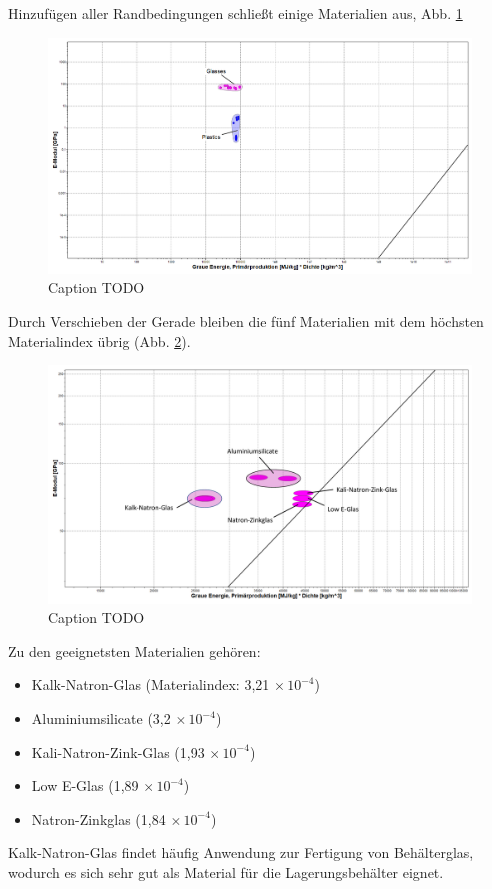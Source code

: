 Hinzufügen aller Randbedingungen schließt einige Materialien aus, Abb. \ref{fig:ces_3_3_2}\\
\begin{figure}[H]
	\centering
	\includegraphics[width=1.0\linewidth]{chapter/Bilder/3_3_2}
	\caption{Caption TODO}
	\label{fig:ces_3_3_2}
\end{figure}
Durch Verschieben der Gerade bleiben die fünf Materialien mit dem höchsten Materialindex übrig (Abb. \ref{fig:ces_3_3_3}).\\
\begin{figure}[H]
	\centering
	\includegraphics[width=1.0\linewidth]{chapter/Bilder/3_3_3}
	\caption{Caption TODO}
	\label{fig:ces_3_3_3}
\end{figure}
Zu den geeignetsten Materialien gehören:
\begin{itemize}
	\item[1)] Kalk-Natron-Glas (Materialindex: 3,21$\,\times10^{-4}$)
	\item[2)] Aluminiumsilicate (3,2$\,\times10^{-4}$) 
	\item[3)] Kali-Natron-Zink-Glas (1,93$\,\times10^{-4}$)
	\item[4)] Low E-Glas (1,89$\,\times10^{-4}$)
	\item[5)] Natron-Zinkglas (1,84$\,\times10^{-4}$)
\end{itemize}
Kalk-Natron-Glas findet häufig Anwendung zur Fertigung von Behälterglas, wodurch es sich sehr gut als Material für die Lagerungsbehälter eignet.

